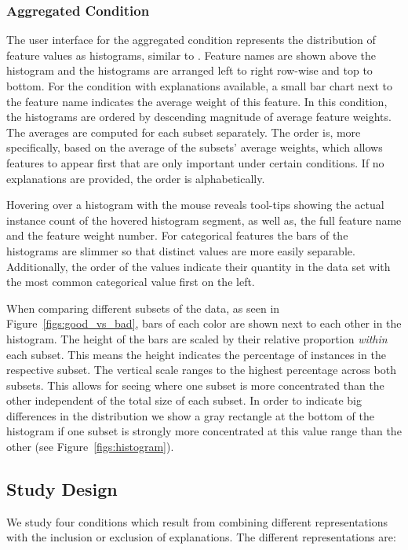 \subsubsection{Aggregated Condition}
The user interface for the aggregated condition represents the distribution of feature values as histograms, similar to \cite{seekaview}.
Feature names are shown above the histogram and the histograms are arranged left to right row-wise and top to bottom.
For the condition with explanations available, a small bar chart next to the feature name indicates the average weight of this feature.
In this condition, the histograms are ordered by descending magnitude of average feature weights.
The averages are computed for each subset separately.
The order is, more specifically, based on the average of the subsets' average weights, which allows features to appear first that are only important under certain conditions.
If no explanations are provided, the order is alphabetically.

Hovering over a histogram with the mouse reveals tool-tips showing the actual instance count of the hovered histogram segment, as well as, the full feature name and the feature weight number.
For categorical features the bars of the histograms are slimmer so that distinct values are more easily separable.
Additionally, the order of the values indicate their quantity in the data set with the most common categorical value first on the left.

When comparing different subsets of the data, as seen in Figure~\ref{figs:good_vs_bad}, bars of each color are shown next to each other in the histogram.
The height of the bars are scaled by their relative proportion \emph{within} each subset.
This means the height indicates the percentage of instances in the respective subset.
The vertical scale ranges to the highest percentage across both subsets.
This allows for seeing where one subset is more concentrated than the other independent of the total size of each subset.
In order to indicate big differences in the distribution we show a gray rectangle at the bottom of the histogram if one subset is strongly more concentrated at this value range than the other (see Figure~\ref{figs:histogram}).

\vspace*{-0.5em}
\subsection{Study Design}
\vspace*{-0.5em}
We study four conditions which result from combining different representations with the inclusion or exclusion of explanations.
The different representations are:

